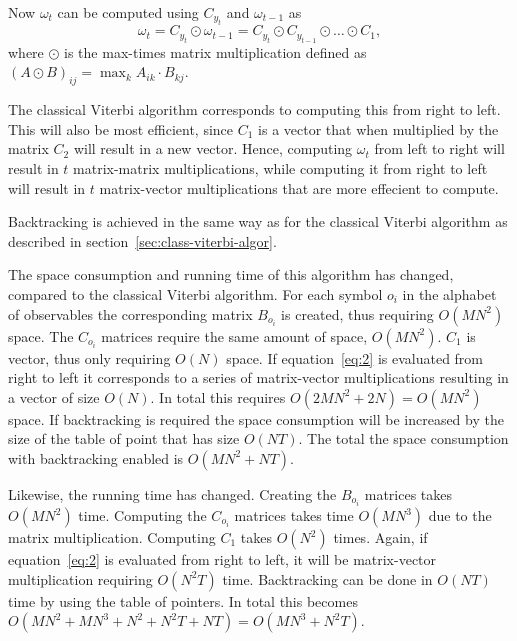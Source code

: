 Now $\omega_t$ can be computed using $C_{y_t}$ and $\omega_{t - 1}$ as
\begin{equation}
  \label{eq:2}
  \omega_t = C_{y_t} \odot \omega_{t - 1} = C_{y_t} \odot C_{y_{t-1}} \odot
  \dots \odot C_1,
\end{equation}
where $\odot$ is the max-times matrix multiplication defined as ${(A \odot
  B)}_{ij} = \max_k A_{ik} \cdot B_{kj}$.

The classical Viterbi algorithm corresponds to computing this from right to
left. This will also be most efficient, since $C_1$ is a vector that when
multiplied by the matrix $C_2$ will result in a new vector. Hence, computing
$\omega_t$ from left to right will result in $t$ matrix-matrix multiplications,
while computing it from right to left will result in $t$ matrix-vector
multiplications that are more effecient to compute.

Backtracking is achieved in the same way as for the classical Viterbi algorithm
as described in section~\ref{sec:class-viterbi-algor}.

The space consumption and running time of this algorithm has changed, compared
to the classical Viterbi algorithm. For each symbol $o_i$ in the alphabet of
observables the corresponding matrix $B_{o_i}$ is created, thus requiring
$O\left(M N^2\right)$ space. The $C_{o_i}$ matrices require the same amount of space,
$O\left(M N^2\right)$. $C_1$ is vector, thus only requiring $O\left(N\right)$ space. If
equation~\eqref{eq:2} is evaluated from right to left it corresponds to a
series of matrix-vector multiplications resulting in a vector of size
$O\left(N\right)$. In total this requires $O\left(2 M N^2 + 2 N\right) = O\left(M N^2\right)$ space. If
backtracking is required the space consumption will be increased by the size of
the table of point that has size $O\left(N T\right)$. The total the space consumption with
backtracking enabled is $O\left(M N^2 + N T\right)$.

Likewise, the running time has changed. Creating the $B_{o_i}$ matrices takes
$O\left(M N^2\right)$ time. Computing the $C_{o_i}$ matrices takes time $O\left(M N^3\right)$ due to
the matrix multiplication. Computing $C_1$ takes $O\left(N^2\right)$ times. Again, if
equation~\eqref{eq:2} is evaluated from right to left, it will be matrix-vector
multiplication requiring $O\left(N^2 T\right)$ time. Backtracking can be done in $O\left(NT\right)$
time by using the table of pointers. In total this becomes $O\left(M N^2 + M N^3 +
N^2 + N^2 T + NT\right) = O\left(M N^3 + N^2 T\right)$.

